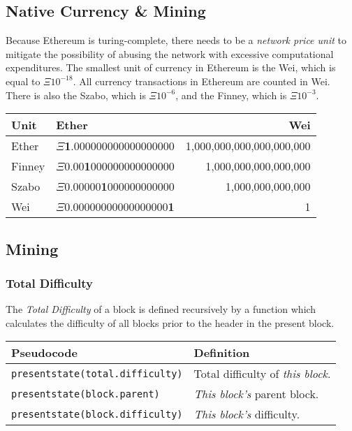\documentclass[10pt,a4paper,leqno,bibliography=totoc]{scrartcl}
\makeatletter
\let\mcnewpage=\newpage
\newcommand{\TrickSupertabularIntoMulticols}{%
\renewcommand\newpage{%
	      \if@firstcolumn
	            \hrule width\linewidth height0pt
          \columnbreak
      \else
        \mcnewpage
       \fi
  }%
 }
\newenvironment{alphafootnotes}
{\par\edef\savedfootnotenumber{\number\value{footnote}}
\renewcommand{\thefootnote}{\alph{footnote}}
\setcounter{footnote}{0}}
{\par\setcounter{footnote}{\savedfootnotenumber}}
\makeatother
\begin{document}
\begin{alphafootnotes}
\clearpage

\tableofcontents

\clearpage

\begin{multicols*}{2}
\TrickSupertabularIntoMulticols
\justify


			

	\section{Native Currency \& Mining}
		Because Ethereum is turing-complete, there needs to be a \textsl{network price  unit} to mitigate the possibility of abusing the network with excessive computational expenditures. The smallest unit of currency in Ethereum is the Wei, which is equal to $\Xi10^{-18}$. All currency transactions in Ethereum are counted in Wei. There  is also the Szabo, which is $\Xi10^{-6}$,  and the Finney, which is $\Xi10^{-3}$. \\ 
		\begin{tabular}{llr}
			\toprule
			\textbf{Unit} & \textbf{Ether} & \textbf{Wei} \\
			\midrule
			\scriptsize{Ether} & \scriptsize{$\Xi$\textbf{1}.000000000000000000} & \scriptsize{1,000,000,000,000,000,000} \\
			\scriptsize{Finney} & \scriptsize{$\Xi$0.00\textbf{1}000000000000000} & \scriptsize{1,000,000,000,000,000} \\
			\scriptsize{Szabo} & \scriptsize{$\Xi$0.00000\textbf{1}000000000000} & \scriptsize{1,000,000,000,000} \\
			\scriptsize{Wei} & \scriptsize{$\Xi$0.00000000000000000\textbf{1}} & \scriptsize{1} \\
			\bottomrule
		\end{tabular}
		\subsection{Mining}
			\subsubsection{Total Difficulty}
				The \textit{Total Difficulty} of a block is defined recursively by a function which calculates the difficulty of all blocks prior to the header in the present block. 
\flushleft			
   \begin{tabular}{ll}
	   \toprule
	   \textbf{Pseudocode} & \textbf{Definition} \\
	   \midrule
	   \texttt{\scriptsize{presentstate(total.difficulty)}} & \scriptsize{Total difficulty of \textsl{this block}.} \\
	   \texttt{\scriptsize{presentstate(block.parent)}}     & \scriptsize{\textsl{This block's} parent block.} \\
	   \texttt{\scriptsize{presentstate(block.difficulty)}} & \scriptsize{\textsl{This block's} difficulty.} \\
	   \bottomrule
   \end{tabular}
\justify


\end{multicols*}
\end{alphafootnotes}
\end{document}
